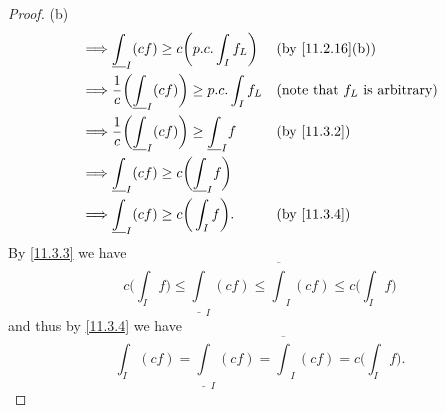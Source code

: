 \begin{proof}{(b)}
\begin{align*}
    \implies & \underline{\int}_I (cf) \geq c \bigg(p.c. \int_I f_L\bigg)                 &  & \text{(by \cref{11.2.16}(b))}           \\
    \implies & \dfrac{1}{c} \bigg(\underline{\int}_I (cf)\bigg) \geq p.c. \int_I f_L      &  & \text{(note that \(f_L\) is arbitrary)} \\
    \implies & \dfrac{1}{c} \bigg(\underline{\int}_I (cf)\bigg) \geq \underline{\int}_I f &  & \by{11.3.2}                             \\
    \implies & \underline{\int}_I (cf) \geq c\bigg(\underline{\int}_I f\bigg)                                                          \\
    \implies & \underline{\int}_I (cf) \geq c\bigg(\int_I f\bigg).                        &  & \by{11.3.4}
  \end{align*}
  By \cref{11.3.3} we have
  \[
    c\bigg(\int_I f\bigg) \leq \underline{\int}_I (cf) \leq \overline{\int}_I (cf) \leq c\bigg(\int_I f\bigg)
  \]
  and thus by \cref{11.3.4} we have
  \[
    \int_I (cf) = \underline{\int}_I (cf) = \overline{\int}_I (cf) = c\bigg(\int_I f\bigg).
  \]


\end{proof}
